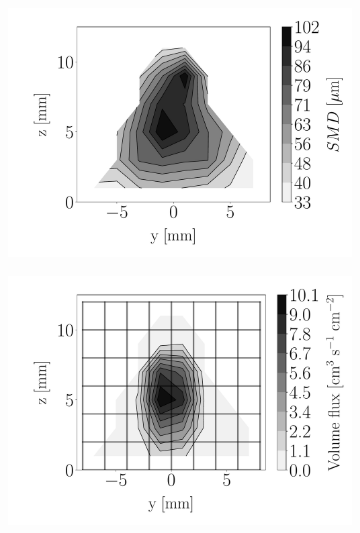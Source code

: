 \begin{figure}[h!]
\centering
\begin{subfigure}[b]{0.3\textwidth}
	\centering
   \includegraphics[scale=\scaleSLIJICF]{./part2_developments/figures_ch5_resolved_JICF/injectors_SLI/uG75_dx10_x10_SMD_map}
\end{subfigure}
   \hspace{0.17in}
\begin{subfigure}[b]{0.3\textwidth}
	\centering
   \includegraphics[scale=\scaleSLIJICF]{./part2_developments/figures_ch5_resolved_JICF/injectors_SLI/uG75_dx10_x10_volume_flux_map}
\end{subfigure}

\end{figure}
